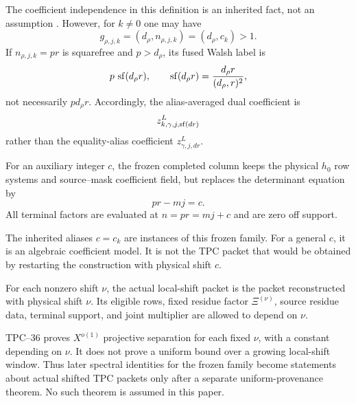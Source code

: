 The coefficient independence in this definition is an inherited fact,
not an assumption \citep{WangTPC42,WangTPC43}.  However, for \(k\ne0\)
one may have
\begin{equation}
 g_{\rho,j,k}=(d_\rho,n_{\rho,j,k})=(d_\rho,c_k)>1.
 \label{eq:tpc46-alias-gcd}
\end{equation}
If \(n_{\rho,j,k}=pr\) is squarefree and \(p>d_\rho\), its fused Walsh
label is
\begin{equation}
 p\,\operatorname{sf}(d_\rho r),
 \qquad
 \operatorname{sf}(d_\rho r)=\frac{d_\rho r}{(d_\rho,r)^2},
 \label{eq:tpc46-alias-residual-label}
\end{equation}
not necessarily \(p d_\rho r\).  Accordingly, the alias-averaged dual
coefficient is
\begin{equation}
 z^L_{k,\gamma,j,\operatorname{sf}(d r)}
 \label{eq:tpc46-alias-dual-coordinate}
\end{equation}
rather than the equality-alias coefficient
\(z^L_{\gamma,j,dr}\).

\begin{definition}
\label{def:tpc46-frozen-family}
For an auxiliary integer \(c\), the frozen completed column keeps the
physical \(h_0\) row systems and source--mask coefficient field, but
replaces the determinant equation by
\begin{equation}
 pr-mj=c.
 \label{eq:tpc46-frozen-equation}
\end{equation}
All terminal factors are evaluated at \(n=pr=mj+c\) and are zero off
support.
\end{definition}

The inherited aliases \(c=c_k\) are instances of this frozen family.
For a general \(c\), it is an algebraic coefficient model.  It is not
the TPC packet that would be obtained by restarting the construction
with physical shift \(c\).

\begin{definition}
\label{def:tpc46-actual-local-family}
For each nonzero shift \(\nu\), the actual local-shift packet is the
packet reconstructed with physical shift \(\nu\).  Its eligible rows,
fixed residue factor \(\Xi^{(\nu)}\), source residue data, terminal
support, and joint multiplier are allowed to depend on \(\nu\).
\end{definition}

TPC--36 proves \(X^{o(1)}\) projective separation for each fixed
\(\nu\), with a constant depending on \(\nu\).  It does not prove a
uniform bound over a growing local-shift window.  Thus later spectral
identities for the frozen family become statements about actual shifted
TPC packets only after a separate uniform-provenance theorem.  No such
theorem is assumed in this paper.
